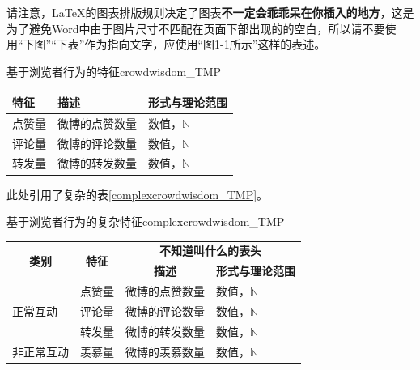 \documentclass[a4paper,AutoFakeBold,oneside,12pt]{book}
\begin{document}
请注意，\LaTeX{}的图表排版规则决定了图表\textbf{不一定会乖乖呆在你插入的地方}，这是为了避免Word中由于图片尺寸不匹配在页面下部出现的的空白，所以请不要使用“下图”“下表”作为指向文字，应使用“图1-1所示”这样的表述。

\begin{bupttable}{基于浏览者行为的特征}{crowdwisdom_TMP}

    \begin{tabular}{l|l|l}
		\hline \textbf{特征} & \textbf{描述} & \textbf{形式与理论范围}\\
		\hline 点赞量 & 微博的点赞数量 & 数值，$\mathbb{N}$ \\
		\hline 评论量 & 微博的评论数量 & 数值，$\mathbb{N}$ \\
		\hline 转发量 & 微博的转发数量 & 数值，$\mathbb{N}$ \\
		\hline
    \end{tabular}
\end{bupttable}

此处引用了复杂的表\ref{complexcrowdwisdom_TMP}。


\begin{bupttable}{基于浏览者行为的复杂特征}{complexcrowdwisdom_TMP}
    \begin{tabular}{l|l|l|l}
        \hline
        \multicolumn{1}{c|}{\multirow{2}{*}{\textbf{类别}}} & \multicolumn{1}{c|}{\multirow{2}{*}{\textbf{特征}}} & \multicolumn{2}{c}{\textbf{不知道叫什么的表头}} \\
        \cline{3-4}
        & & \multicolumn{1}{c|}{\textbf{描述}} & \multicolumn{1}{c}{\textbf{形式与理论范围}} \\
        \hline
        \multirow{3}{*}{正常互动} & 点赞量 & 微博的点赞数量 & 数值，$\mathbb{N}$ \\
        \cline{2-4}
        & 评论量 & 微博的评论数量 & 数值，$\mathbb{N}$ \\
        \cline{2-4}
        & 转发量 & 微博的转发数量 & 数值，$\mathbb{N}$ \\
        \hline
        非正常互动 & 羡慕量 & 微博的羡慕数量 & 数值，$\mathbb{N}$ \\
        \hline
    \end{tabular}
\end{bupttable}
\end{document}
